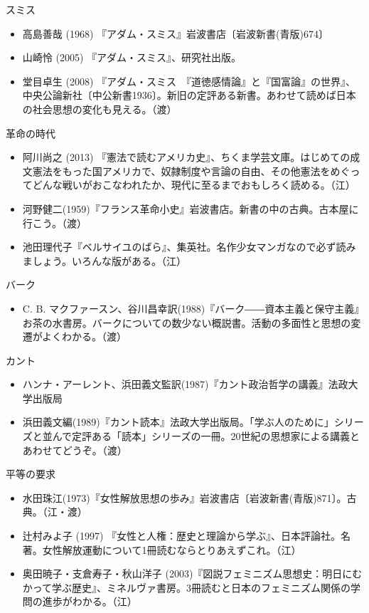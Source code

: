\documentclass[dvipdfmx]{jsarticle}
\begin{document}
スミス

\begin{itemize}
\item 高島善哉 (1968) 『アダム・スミス』岩波書店〔岩波新書(青版)674〕
\item 山崎怜 (2005) 『アダム・スミス』、研究社出版。
\item 堂目卓生 (2008) 『アダム・スミス　『道徳感情論』と『国富論』の世界』、中央公論新社〔中公新書1936〕。新旧の定評ある新書。あわせて読めば日本の社会思想の変化も見える。（渡）
\end{itemize}

革命の時代

\begin{itemize}
\item 阿川尚之 (2013) 『憲法で読むアメリカ史』、ちくま学芸文庫。はじめての成文憲法をもった国アメリカで、奴隷制度や言論の自由、その他憲法をめぐってどんな戦いがおこなわれたか、現代に至るまでおもしろく読める。（江）
\item 河野健二(1959)『フランス革命小史』岩波書店。新書の中の古典。古本屋に行こう。（渡）
\item 池田理代子『ベルサイユのばら』、集英社。名作少女マンガなので必ず読みましょう。いろんな版がある。（江）
\end{itemize}

バーク

\begin{itemize}
\item C. B. マクファースン、谷川昌幸訳(1988)『バーク――資本主義と保守主義』お茶の水書房。バークについての数少ない概説書。活動の多面性と思想の変遷がよくわかる。（渡）

\end{itemize}

カント
\begin{itemize}
\item 
ハンナ・アーレント、浜田義文監訳(1987)『カント政治哲学の講義』法政大学出版局
\item 浜田義文編(1989)『カント読本』法政大学出版局。「学ぶ人のために」シリーズと並んで定評ある「読本」シリーズの一冊。20世紀の思想家による講義とあわせてどうぞ。（渡）
\end{itemize}


平等の要求

\begin{itemize}
\item 水田珠江(1973)『女性解放思想の歩み』岩波書店〔岩波新書(青版)871〕。古典。（江・渡）
\item 辻村みよ子 (1997) 『女性と人権：歴史と理論から学ぶ』、日本評論社。名著。女性解放運動について1冊読むならとりあえずこれ。（江）
\item 奥田暁子・支倉寿子・秋山洋子 (2003)『図説フェミニズム思想史：明日にむかって学ぶ歴史』、ミネルヴァ書房。3冊読むと日本のフェミニズム関係の学問の進歩がわかる。（江）
\end{itemize}
\end{document}

